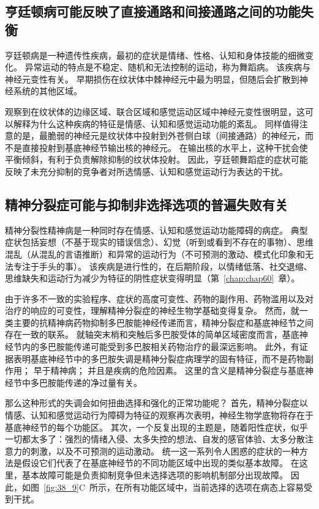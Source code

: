 \subsection{亨廷顿病可能反映了直接通路和间接通路之间的功能失衡}

亨廷顿病是一种遗传性疾病，最初的症状是情绪、性格、认知和身体技能的细微变化。
异常运动的特点是不稳定、随机和无法控制的运动，称为舞蹈病。
该疾病与神经元变性有关。
早期损伤在纹状体中棘神经元中最为明显，但随后会扩散到神经系统的其他区域。


观察到在纹状体的边缘区域、联合区域和感觉运动区域中神经元变性很明显，这可以解释为什么这种疾病的特征是情感、认知和感觉运动功能的紊乱。
同样值得注意的是，最脆弱的神经元是纹状体中投射到外苍侧白球（间接通路）的神经元，而不是直接投射到基底神经节输出核的神经元。
在输出核的水平上，这种干扰会使平衡倾斜，有利于负责解除抑制的纹状体投射。
因此，亨廷顿舞蹈症的症状可能反映了未充分抑制的竞争者对所选情感、认知和感觉运动行为表达的干扰。



\subsection{精神分裂症可能与抑制非选择选项的普遍失败有关}

精神分裂性精神病是一种同时存在情感、认知和感觉运动功能障碍的病症。
典型症状包括妄想（不基于现实的错误信念）、幻觉（听到或看到不存在的事物）、思维混乱（从混乱的言语推断）和异常的运动行为（不可预测的激动、模式化印象和无法专注于手头的事）。
该疾病是进行性的，在后期阶段，以情绪低落、社交退缩、思维缺失和运动行为减少为特征的阴性症状变得明显（第~\ref{chap:chap60}~章）。


由于许多不一致的实验程序、症状的高度可变性、药物的副作用、药物滥用以及对治疗的响应的可变性，理解精神分裂症的神经生物学基础变得复杂。
然而，就一类主要的抗精神病药物抑制多巴胺能神经传递而言，精神分裂症和基底神经节之间存在一致的联系。
就轴突末梢和突触后多巴胺受体的简单区域密度而言，基底神经节内的多巴胺能传递可能受到多巴胺相关药物治疗的最深远影响。
此外，有证据表明基底神经节中的多巴胺失调是精神分裂症病理学的固有特征，而不是药物副作用；
早于精神病；
并且是疾病的危险因素。
这里的含义是精神分裂症与基底神经节中多巴胺能传递的净过量有关。


那么这种形式的失调会如何扭曲选择和强化的正常功能呢？
首先，精神分裂症以情感、认知和感觉运动行为障碍为特征的观察再次表明，神经生物学底物将存在于基底神经节的每个功能区。
其次，一个反复出现的主题是，随着阳性症状，似乎一切都太多了：强烈的情绪入侵、太多失控的想法、自发的感官体验、太多分散注意力的刺激，以及不可预测的运动激动。
统一这一系列令人困惑的症状的一种方法是假设它们代表了在基底神经节的不同功能区域中出现的类似基本故障。
在这里，基本故障可能是负责抑制竞争但未选择选项的影响机制部分出现故障。
因此，如图~\ref{fig:38_9}C~所示，在所有功能区域中，当前选择的选项在病态上容易受到干扰。



